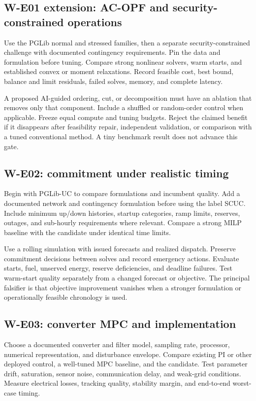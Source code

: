 \documentclass[11pt,letterpaper]{article}
\begin{document}
\subsection{W-E01 extension: AC-OPF and security-constrained operations}
Use the PGLib normal and stressed families, then a separate security-constrained challenge with documented contingency requirements. Pin the data and formulation before tuning. Compare strong nonlinear solvers, warm starts, and established convex or moment relaxations. Record feasible cost, best bound, balance and limit residuals, failed solves, memory, and complete latency.

A proposed AI-guided ordering, cut, or decomposition must have an ablation that removes only that component. Include a shuffled or random-order control when applicable. Freeze equal compute and tuning budgets. Reject the claimed benefit if it disappears after feasibility repair, independent validation, or comparison with a tuned conventional method. A tiny benchmark result does not advance this gate.

\subsection{W-E02: commitment under realistic timing}
Begin with PGLib-UC to compare formulations and incumbent quality. Add a documented network and contingency formulation before using the label SCUC. Include minimum up/down histories, startup categories, ramp limits, reserves, outages, and sub-hourly requirements where relevant. Compare a strong MILP baseline with the candidate under identical time limits.

Use a rolling simulation with issued forecasts and realized dispatch. Preserve commitment decisions between solves and record emergency actions. Evaluate starts, fuel, unserved energy, reserve deficiencies, and deadline failures. Test warm-start quality separately from a changed forecast or objective. The principal falsifier is that objective improvement vanishes when a stronger formulation or operationally feasible chronology is used.

\subsection{W-E03: converter MPC and implementation}
Choose a documented converter and filter model, sampling rate, processor, numerical representation, and disturbance envelope. Compare existing PI or other deployed control, a well-tuned MPC baseline, and the candidate. Test parameter drift, saturation, sensor noise, communication delay, and weak-grid conditions. Measure electrical losses, tracking quality, stability margin, and end-to-end worst-case timing.
\end{document}
